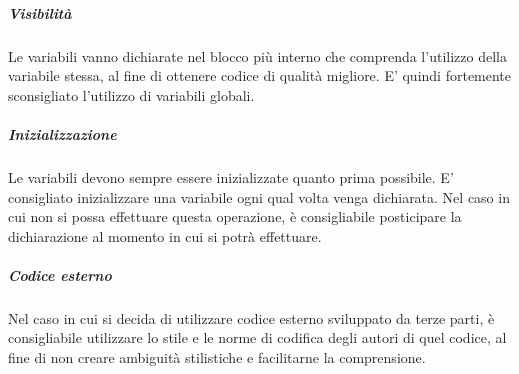	\subparagraph{Visibilità}
	Le variabili vanno dichiarate nel blocco più interno che comprenda l'utilizzo della variabile stessa, al fine di ottenere codice di qualità migliore. E' quindi fortemente sconsigliato l'utilizzo di variabili globali.
	
	\subparagraph{Inizializzazione}
	Le variabili devono sempre essere inizializzate quanto prima possibile. E' consigliato inizializzare una variabile ogni qual volta venga dichiarata. Nel caso in cui non si possa effettuare questa operazione, è consigliabile posticipare la dichiarazione al momento in cui si potrà effettuare.
	
	\subparagraph{Codice esterno}
	Nel caso in cui si decida di utilizzare codice esterno sviluppato da terze parti, è consigliabile utilizzare lo stile e le norme di codifica degli autori di quel codice, al fine di non creare ambiguità stilistiche e facilitarne la comprensione.
	
	
